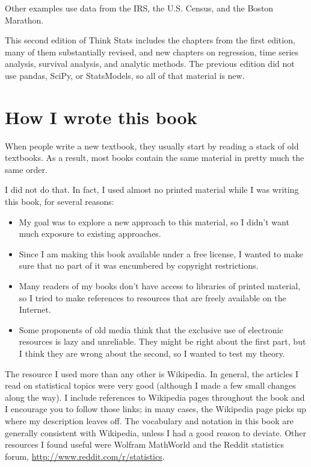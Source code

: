 \documentclass[]{book}
\providecommand{\tightlist}{%
  \setlength{\itemsep}{0pt}\setlength{\parskip}{0pt}}
\begin{document}
Other examples use data from the IRS, the U.S. Census, and the Boston
Marathon.

This second edition of Think Stats includes the chapters from the first edition, many of them substantially revised, and new chapters on regression, time series analysis, survival analysis, and analytic methods. The previous edition did not use pandas, SciPy, or StatsModels, so all of that material is new.

\hypertarget{how-i-wrote-this-book}{%
\section{How I wrote this book}\label{how-i-wrote-this-book}}

When people write a new textbook, they usually start by reading a stack
of old textbooks. As a result, most books contain the same material in
pretty much the same order.

I did not do that. In fact, I used almost no printed material while I
was writing this book, for several reasons:

\begin{itemize}
\tightlist
\item
  My goal was to explore a new approach to this material, so I didn't
  want much exposure to existing approaches.
\item
  Since I am making this book available under a free license, I wanted
  to make sure that no part of it was encumbered by copyright
  restrictions.
\item
  Many readers of my books don't have access to libraries of printed
  material, so I tried to make references to resources that are freely
  available on the Internet.
\item
  Some proponents of old media think that the exclusive use of
  electronic resources is lazy and unreliable. They might be right
  about the first part, but I think they are wrong about the second,
  so I wanted to test my theory.
\end{itemize}

The resource I used more than any other is Wikipedia. In general, the
articles I read on statistical topics were very good (although I made a
few small changes along the way). I include references to Wikipedia
pages throughout the book and I encourage you to follow those links; in
many cases, the Wikipedia page picks up where my description leaves off.
The vocabulary and notation in this book are generally consistent with
Wikipedia, unless I had a good reason to deviate. Other resources I
found useful were Wolfram MathWorld and the Reddit statistics forum,
\url{http://www.reddit.com/r/statistics}.
\end{document}

